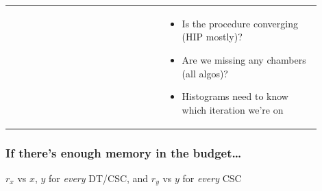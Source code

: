 \documentclass[compress]{beamer}
\begin{document}
\begin{frame}
\begin{tabular}{p{0.45\linewidth} p{0.45\linewidth}}
\begin{minipage}{\linewidth}
\end{minipage} &
\begin{minipage}{1.2\linewidth}
\begin{itemize}
\item Is the procedure converging (HIP mostly)?
\item Are we missing any chambers (all algos)?
\item Histograms need to know which iteration we're on
\end{itemize}
\end{minipage}
\end{tabular}
\end{frame}

\begin{frame}
\frametitle{If there's enough memory in the budget\ldots}

  $r_x$ vs $x$, $y$ for {\it every} DT/CSC, and $r_y$ vs $y$ for
  {\it every} CSC

  \vspace{-0.75 cm}
  \begin{center}


\end{center}
\end{frame}
\end{document}
